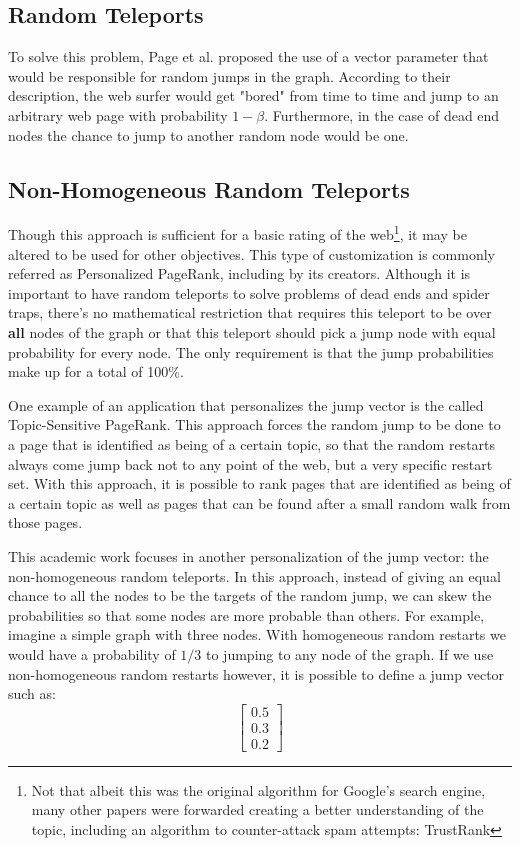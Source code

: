 \subsection{Random Teleports}
To solve this problem, Page et al.\cite{page1999pagerank} proposed the use of a vector parameter that would be responsible for random jumps in the graph. According to their description, the web surfer would get "bored" from time to time and jump to an arbitrary web page with probability $1-\beta$. Furthermore, in the case of dead end nodes the chance to jump to another random node would be one. 

\subsection{Non-Homogeneous Random Teleports}
Though this approach is sufficient for a basic rating of the web\footnote{Not that albeit this was the original algorithm for Google's search engine, many other papers were forwarded creating a better understanding of the topic, including an algorithm to counter-attack spam attempts: TrustRank}, it may be altered to be used for other objectives. This type of customization is commonly referred as Personalized PageRank, including by its creators\cite{page1999pagerank}. Although it is important to have random teleports to solve problems of dead ends and spider traps, there's no mathematical restriction that requires this teleport to be over \textbf{all} nodes of the graph or that this teleport should pick a jump node with equal probability for every node. The only requirement is that the jump probabilities make up for a total of 100\%.

One example of an application that personalizes the jump vector is the called Topic-Sensitive PageRank\cite{haveliwala2002topic}. This approach forces the random jump to be done to a page that is identified as being of a certain topic, so that the random restarts always come jump back not to any point of the web, but a very specific restart set. With this approach, it is possible to rank pages that are identified as being of a certain topic as well as pages that can be found after a small random walk from those pages.

This academic work focuses in another personalization of the jump vector: the non-homogeneous random teleports. In this approach, instead of giving an equal chance to all the nodes to be the targets of the random jump, we can skew the probabilities so that some nodes are more probable than others. For example, imagine a simple graph with three nodes. With homogeneous random restarts we would have a probability of $1/3$ to jumping to any node of the graph. If we use non-homogeneous random restarts however, it is possible to define a jump vector such as:
\[
\begin{bmatrix}
0.5 \\
0.3 \\
0.2
\end{bmatrix}
\]

